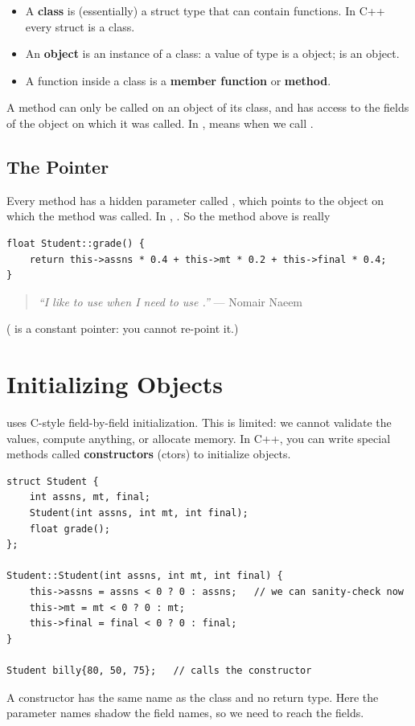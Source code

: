 \begin{definition}
\begin{itemize}
  \item A \textbf{class} is (essentially) a struct type that can contain
        functions. In C++ every struct is a class.
  \item An \textbf{object} is an instance of a class: a value of type
         is a  object;  is an object.
  \item A function inside a class is a \textbf{member function} or
        \textbf{method}.
\end{itemize}
\end{definition}

A method can only be called on an object of its class, and has access to the
fields of the object on which it was called. In , 
means  when we call .

\subsection{The  Pointer}
Every method has a hidden parameter called , which points to the
object on which the method was called. In ,
. So the method above is really
\begin{lstlisting}[style=cpp]
float Student::grade() {
    return this->assns * 0.4 + this->mt * 0.2 + this->final * 0.4;
}
\end{lstlisting}
\begin{quote}
\textit{``I like to use  when I need to use .''} --- Nomair
Naeem
\end{quote}
( is a constant pointer: you cannot re-point it.)

\section{Initializing Objects}
 uses C-style field-by-field initialization.
This is limited: we cannot validate the values, compute anything, or allocate
memory. In C++, you can write special methods called \textbf{constructors}
(ctors) to initialize objects.

\begin{lstlisting}[style=cpp]
struct Student {
    int assns, mt, final;
    Student(int assns, int mt, int final);
    float grade();
};

Student::Student(int assns, int mt, int final) {
    this->assns = assns < 0 ? 0 : assns;   // we can sanity-check now
    this->mt = mt < 0 ? 0 : mt;
    this->final = final < 0 ? 0 : final;
}

Student billy{80, 50, 75};   // calls the constructor
\end{lstlisting}
A constructor has the same name as the class and no return type. Here the
parameter names shadow the field names, so we need  to reach the
fields.

